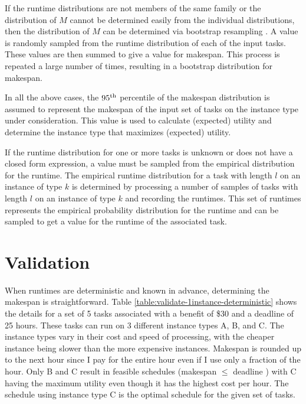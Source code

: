 \documentclass[12pt]{report}
\begin{document}
If the runtime distributions are not members of the same family or the distribution of $M$ cannot be determined easily from the individual distributions, then the distribution of $M$ can be determined via bootstrap resampling \cite{Efron1993}.
A value is randomly sampled from the runtime distribution of each of the input tasks.
These values are then summed to give a value for makespan.
This process is repeated a large number of times, resulting in a bootstrap distribution for makespan.

In all the above cases, the $95\textsuperscript{th}$ percentile of the makespan distribution is assumed to represent the makespan of the input set of tasks on the instance type under consideration.
This value is used to calculate (expected) utility and determine the instance type that maximizes (expected) utility.


If the runtime distribution for one or more tasks is unknown or does not have a closed form expression, a value must be sampled from the empirical distribution for the runtime.
The empirical runtime distribution for a task with length $l$ on an instance of type $k$ is determined by processing a number of samples of tasks with length $l$ on an instance of type $k$ and recording the runtimes.
This set of runtimes represents the empirical probability distribution for the runtime and can be sampled to get a value for the runtime of the associated task.

\section{Validation}

\label{validate:runtimes:deterministic}
When runtimes are deterministic and known in advance, determining the makespan is straightforward. 
Table \ref{table:validate-1instance-deterministic} shows the details for a set of 5 tasks associated with a benefit of \$30 and a deadline of 25 hours. 
These tasks can run on 3 different instance types A, B, and C. 
The instance types vary in their cost and speed of processing, with the cheaper instance being slower than the more expensive instances. 
Makespan is rounded up to the next hour since I pay for the entire hour even if I use only a fraction of the hour. 
Only B and C result in feasible schedules (makespan $\leq$ deadline ) with C having the maximum utility even though it has the highest cost per hour.
The schedule using instance type C is the optimal schedule for the given set of tasks.
\end{document}
